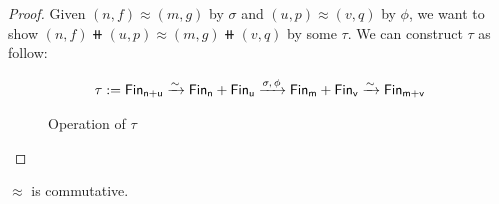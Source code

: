 \begin{proof}
    Given $(n, f) \approx (m, g)$ by $\sigma$ and $(u, p) \approx (v, q)$ by $\phi$,
    we want to show $(n, f) \doubleplus (u, p) \approx (m, g) \doubleplus (v, q)$ by some $\tau$.
    We can construct $\tau$ as follow:

    \begin{align*}
        \tau := \Fin[n+u] \xto{\sim} \Fin[n] + \Fin[u] \xto{\sigma,\,\phi} \Fin[m] + \Fin[v] \xto{\sim} \Fin[m+v] \\
    \end{align*}
   
    \begin{figure}[H]
        \centering
        \caption{Operation of $\tau$}
        \label{fig:enter-label}
    \end{figure}
    
\end{proof}

\begin{proposition}\label{bag:comm}
    $\approx$ is commutative.
\end{proposition}

